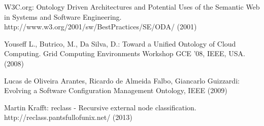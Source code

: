 \newblock W3C.org: Ontology Driven Architectures and Potential Uses of the Semantic Web in Systems and Software Engineering. http://www.w3.org/2001/sw/BestPractices/SE/ODA/ (2001)

\newblock Youseff L., Butrico, M., Da Silva, D.: Toward a Unified Ontology of Cloud Computing. Grid Computing Environments Workshop GCE '08, IEEE, USA. (2008)

\newblock Lucas de Oliveira Arantes, Ricardo de Almeida Falbo, Giancarlo Guizzardi: Evolving a Software Configuration Management Ontology, IEEE (2009)

\newblock Martin Krafft: reclass - Recursive external node classification. http://reclass.pantsfullofunix.net/ (2013)










